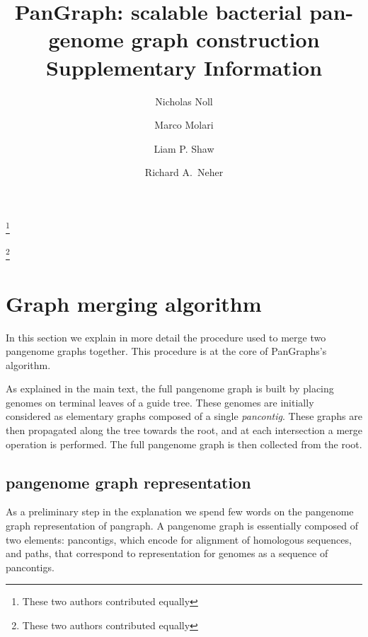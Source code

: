 \documentclass[aps,rmp,reprint,superscriptaddress,notitlepage,10pt,onecolumn]{revtex4-1}
\begin{document}
\title{PanGraph: scalable bacterial pan-genome graph construction \\ Supplementary Information}
\author{Nicholas Noll}
\thanks{These two authors contributed equally}
\author{Marco Molari}
\thanks{These two authors contributed equally}
\author{Liam P. Shaw}
\author{Richard A.~Neher}

\maketitle

\section{Graph merging algorithm}
\label{supp:graph_merging}

In this section we explain in more detail the procedure used to merge two pangenome graphs together. This procedure is at the core of PanGraphs's algorithm.

As explained in the main text, the full pangenome graph is built by placing genomes on terminal leaves of a guide tree. These genomes are initially considered as elementary graphs composed of a single \textit{pancontig}. These graphs are then propagated along the tree towards the root, and at each intersection a merge operation is performed. The full pangenome graph is then collected from the root.

\subsection*{pangenome graph representation}

As a preliminary step in the explanation we spend few words on the pangenome graph representation of pangraph. A pangenome graph is essentially composed of two elements: pancontigs, which encode for alignment of homologous sequences, and paths, that correspond to representation for genomes as a sequence of pancontigs.
\end{document}
